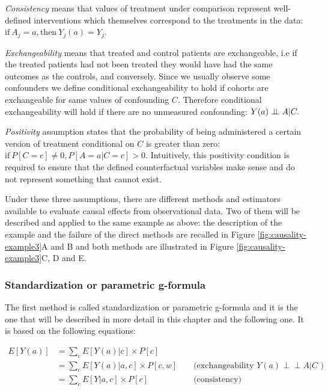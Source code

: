 \documentclass[a4paper,12pt,twoside,onecolumn,openright,final,oldfontcommands]{memoir}
\begin{document}
\emph{Consistency} means that values of treatment under comparison
represent well-defined interventions which themselves correspond to the
treatments in the data:
\(\textrm{if} \: A_j=a, \textrm{then} \: Y_j(a)=Y_j.\)

\emph{Exchangeability} means that treated and control patients are
exchangeable, i.e if the treated patients had not been treated they
would have had the same outcomes as the controls, and conversely. Since
we usually observe some confounders we define conditional
exchangeability to hold if cohorts are exchangeable for same values of
confounding \(C\). Therefore conditional exchangeability will hold if
there are no unmeasured confounding: \(Y(a) \perp \!\!\! \perp A | C.\)

\emph{Positivity} assumption states that the probability of being
administered a certain version of treatment conditional on \(C\) is
greater than zero: \(\textrm{if} \: P[C=c] \neq 0, P[A=a | C=c] >0.\)
Intuitively, this positivity condition is required to ensure that the
defined counterfactual variables make sense and do not represent
something that cannot exist.

Under these three assumptions, there are different methods and
estimators available to evaluate causal effects from observational data.
Two of them will be described and applied to the same example as above:
the description of the example and the failure of the direct methods are
recalled in Figure \ref{fig:causality-example3}A and B and both methods
are illustrated in Figure \ref{fig:causality-example3}C, D and E.

\subsubsection{Standardization or parametric
g-formula}\label{standardization-or-parametric-g-formula}

The first method is called standardization or parametric g-formula and
it is the one that will be described in more detail in this chapter and
the following one. It is based on the following equations:

\begin{equation*}
\begin{aligned}
  E[Y(a)] & = \sum_{c} E[Y(a)|c] \times P[c] \\
          & = \sum_{c} E[Y(a)|a,c] \times P[c,w]
          &&\text{ (exchangeability } Y(a) \perp \!\!\! \perp A | C \text{ )} \\
          & = \sum_{c} E[Y|a,c] \times P[c]
          &&\text{ (consistency)}
\end{aligned}
\end{equation*}
\end{document}
